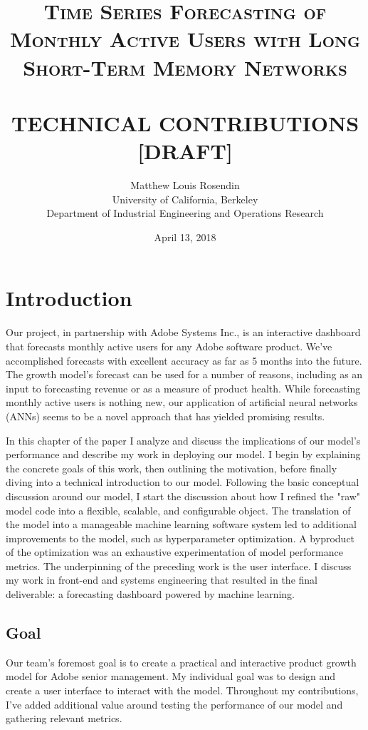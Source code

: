 \documentclass[11pt, oneside]{article}
\title{
  \normalsize \textsc{    Time Series Forecasting of Monthly Active Users with Long Short-Term Memory
      Networks} \\ [2.0cm]
  \HRule{0.5pt} \\
  \LARGE \textbf{\uppercase{
    Technical Contributions [DRAFT]
  }}
  \HRule{2pt} \\ [0.5cm]
  \vspace*{5\baselineskip}
}
\author{
  Matthew Louis Rosendin \\
  University of California, Berkeley \\
  Department of Industrial Engineering and Operations Research
}
\date{April 13, 2018}
\begin{document}
\maketitle
\newpage

\tableofcontents
\newpage

\listoffigures
\newpage

\section{Introduction}
Our project, in partnership with Adobe Systems Inc., is an interactive dashboard that forecasts monthly active users for any Adobe software product. We've accomplished forecasts with excellent accuracy as far as 5 months into the future. The growth model's forecast can be used for a number of reasons, including as an input to forecasting revenue or as a measure of product health. While forecasting monthly active users is nothing new, our application of artificial neural networks (ANNs) seems to be a novel approach that has yielded promising results.

In this chapter of the paper I analyze and discuss the implications of our model's performance and describe my work in deploying our model. I begin by explaining the concrete goals of this work, then outlining the motivation, before finally diving into a technical introduction to our model. Following the basic conceptual discussion around our model, I start the discussion about how I refined the "raw" model code into a flexible, scalable, and configurable object. The translation of the model into a manageable machine learning software system led to additional improvements to the model, such as hyperparameter optimization. A byproduct of the optimization was an exhaustive experimentation of model performance metrics. The underpinning of the preceding work is the user interface. I discuss my work in front-end and systems engineering that resulted in the final deliverable: a forecasting dashboard powered by machine learning.

\subsection{Goal}
Our team's foremost goal is to create a practical and interactive product growth model for Adobe senior management. My individual goal was to design and create a user interface to interact with the model. Throughout my contributions, I've added additional value around testing the performance of our model and gathering relevant metrics.
\end{document}
